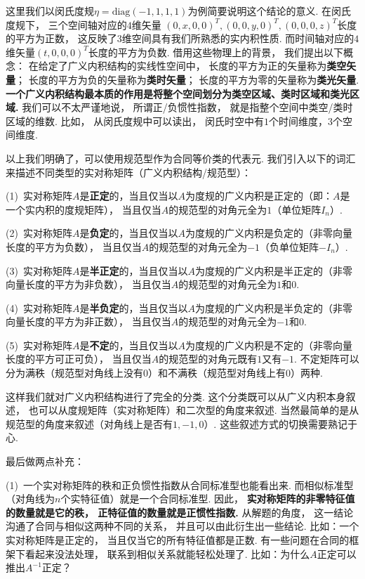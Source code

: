 这里我们以闵氏度规$\eta = \mathrm{diag}(-1,1,1,1)$为例简要说明这个结论的意义.
在闵氏度规下，
三个空间轴对应的$4$维矢量
$(0,x,0,0)^T,(0,0,y,0)^T,(0,0,0,z)^T$长度的平方为正数，
这反映了$3$维空间具有我们所熟悉的实内积性质.
而时间轴对应的$4$维矢量$(t,0,0,0)^T$长度的平方为负数.
借用这些物理上的背景，
我们提出以下概念：
在给定了广义内积结构的实线性空间中，
长度的平方为正的矢量称为\textbf{类空矢量}；
长度的平方为负的矢量称为\textbf{类时矢量}；
长度的平方为零的矢量称为\textbf{类光矢量}.
\textbf{一个广义内积结构最本质的作用是将整个空间划分为类空区域、类时区域和类光区域.}
我们可以不太严谨地说，
所谓正/负惯性指数，
就是指整个空间中类空/类时区域的维数.
比如，
从闵氏度规中可以读出，
闵氏时空中有$1$个时间维度，$3$个空间维度.

以上我们明确了，可以使用规范型作为合同等价类的代表元.
我们引入以下的词汇来描述不同类型的实对称矩阵（广义内积结构/规范型）：

\medskip

(1)~实对称矩阵$A$是\textbf{正定}的，当且仅当以$A$为度规的广义内积是正定的（即：$A$是一个实内积的度规矩阵），
当且仅当$A$的规范型的对角元全为$1$（单位矩阵$I_n$）.

(2)~实对称矩阵$A$是\textbf{负定}的，当且仅当以$A$为度规的广义内积是负定的（非零向量长度的平方为负数），
当且仅当$A$的规范型的对角元全为$-1$（负单位矩阵$-I_n$）.

(3)~实对称矩阵$A$是\textbf{半正定}的，当且仅当以$A$为度规的广义内积是半正定的（非零向量长度的平方为非负数），
当且仅当$A$的规范型的对角元全为$1$和$0$.

(4)~实对称矩阵$A$是\textbf{半负定}的，当且仅当以$A$为度规的广义内积是半负定的（非零向量长度的平方为非正数），
当且仅当$A$的规范型的对角元全为$-1$和$0$.

(5)~实对称矩阵$A$是\textbf{不定}的，当且仅当以$A$为度规的广义内积是不定的（非零向量长度的平方可正可负），
当且仅当$A$的规范型的对角元既有$1$又有$-1$.
不定矩阵可以分为满秩（规范型对角线上没有$0$）和不满秩（规范型对角线上有$0$）两种.

\medskip

这样我们就对广义内积结构进行了完全的分类.
这个分类既可以从广义内积本身叙述，
也可以从度规矩阵（实对称矩阵）和二次型的角度来叙述.
当然最简单的是从规范型的角度来叙述（对角线上是否有$1,-1,0$）.
这些叙述方式的切换需要熟记于心.

最后做两点补充：

(1)~一个实对称矩阵的秩和正负惯性指数从合同标准型也能看出来.
而相似标准型（对角线为$n$个实特征值）就是一个合同标准型.
因此，
\textbf{实对称矩阵的非零特征值的数量就是它的秩，
正特征值的数量就是正惯性指数.}
从解题的角度，
这一结论沟通了合同与相似这两种不同的关系，
并且可以由此衍生出一些结论.
比如：一个实对称矩阵是正定的，
当且仅当它的所有特征值都是正数.
有一些问题在合同的框架下看起来没法处理，
联系到相似关系就能轻松处理了.
比如：为什么$A$正定可以推出$A^{-1}$正定？


